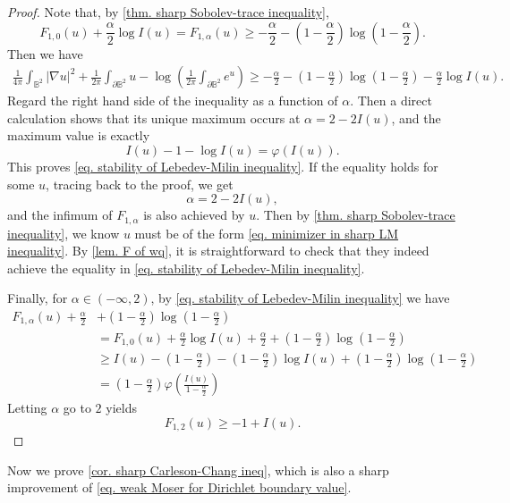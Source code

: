 \documentclass[11pt,a4paper,twoside]{amsart}
\newtheorem{sketch proof}{Sketch of the proof}[section]
\begin{document}
    \begin{proof}
        Note that, by \cref{thm. sharp Sobolev-trace inequality},
        \[
        F_{1,0}(u)
        +\frac{\alpha}{2}\log I(u)
        =F_{1,\alpha}(u)
        \geq -\frac{\alpha}{2}
        -\left(1-\frac{\alpha}{2}\right)
        \log\left(1-\frac{\alpha}{2}\right).
        \]
        Then  we have
        \begin{align*}
            \frac{1}{4\pi}
        \int_{\mathbb{B}^2}|\nabla u|^2
        +\frac{1}{2\pi}
        \int_{\partial \mathbb{B}^2}u
        -\log\left(
        \frac{1}{2\pi}
        \int_{\partial\mathbb{B}^2}e^{u}
        \right)
        \geq -\frac{\alpha}{2}
        -\left(1-\frac{\alpha}{2}\right)
        \log\left(1-\frac{\alpha}{2}\right)
        -\frac{\alpha}{2}\log I(u).
        \end{align*}
        Regard the right hand side of the inequality as a function of $\alpha$. Then a direct calculation shows that its unique maximum occurs at $\alpha=2-2I(u)$, and the maximum value is exactly
        \[
        I(u)-1-\log I(u)=\varphi(I(u)).
        \]
        This proves \cref{eq. stability of Lebedev-Milin inequality}. If the equality holds for some $u$, tracing back to the proof, we get 
        \[
        \alpha=2-2I(u),
        \]
        and the infimum of $F_{1,\alpha}$ is also achieved by $u$. Then by \cref{thm. sharp Sobolev-trace inequality}, we know $u$ must be of the form \cref{eq. minimizer in sharp LM inequality}. By \cref{lem. F of wq}, it is straightforward to check that they indeed achieve the equality in \cref{eq. stability of Lebedev-Milin inequality}.

        Finally, for $\alpha\in(-\infty,2)$, by \cref{eq. stability of Lebedev-Milin inequality} we have
        \begin{align*}
            F_{1,\alpha}(u) 
       +\frac{\alpha}{2}
        & +\left(1-\frac{\alpha}{2}\right)
        \log\left(1-\frac{\alpha}{2}\right)\\
        &= F_{1,0}(u)+\frac{\alpha}{2}\log I(u)
        +\frac{\alpha}{2}
        +\left(1-\frac{\alpha}{2}\right)
        \log\left(1-\frac{\alpha}{2}\right)\\
        & \geq I(u)
        -\left(1-\frac{\alpha}{2}\right)
        -\left(1-\frac{\alpha}{2}\right)\log I(u)
        +\left(1-\frac{\alpha}{2}\right)
        \log \left(1-\frac{\alpha}{2}\right) \\
        & =\left(1-\frac{\alpha}{2}\right)
        \varphi\left(
        \frac{I(u)}{1-\frac{\alpha}{2}}\right)
        \end{align*}
        Letting $\alpha$ go to $2$ yields
        \[
        F_{1,2}(u)
        \geq -1+I(u).
        \]
    \end{proof}
    Now we prove \cref{cor. sharp Carleson-Chang ineq}, which is also a sharp improvement of \cref{eq. weak Moser for Dirichlet boundary value}.
    
\end{document}
